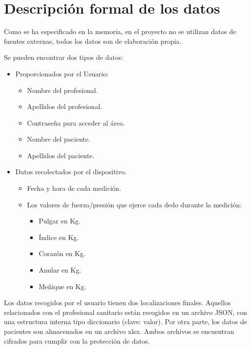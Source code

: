 \section{Descripción formal de los datos}

Como se ha especificado en la memoria, en el proyecto no se utilizan datos de fuentes externas, todos los datos son de elaboración propia.

Se pueden encontrar dos tipos de datos:
\begin{itemize}
    \item Proporcionados por el Usuario:
    \begin{itemize}
        \item Nombre del profesional. 
        \item Apellidos del profesional.
        \item Contraseña para acceder al área.
        \item Nombre del paciente.
        \item Apellidos del paciente.
    \end{itemize}
        \item Datos recolectados por el dispositivo.
        \begin{itemize}
            \item Fecha y hora de cada medición.
            \item Los valores de fuerza/presión que ejerce cada dedo durante la medición:
            \begin{itemize}
                \item Pulgar en Kg.
                \item Índice en Kg.
                \item Corazón en Kg.
                \item Anular en Kg.
                \item Meñique en Kg.
            \end{itemize}
        \end{itemize}
\end{itemize}

Los datos recogidos por el usuario tienen dos localizaciones finales. Aquellos relacionados con el profesional sanitario están recogidos en un archivo JSON, con una estructura interna tipo diccionario (clave: valor). Por otra parte, los datos de pacientes son almacenados en un archivo xlsx. Ambos archivos se encuentran cifrados para cumplir con la protección de datos.


